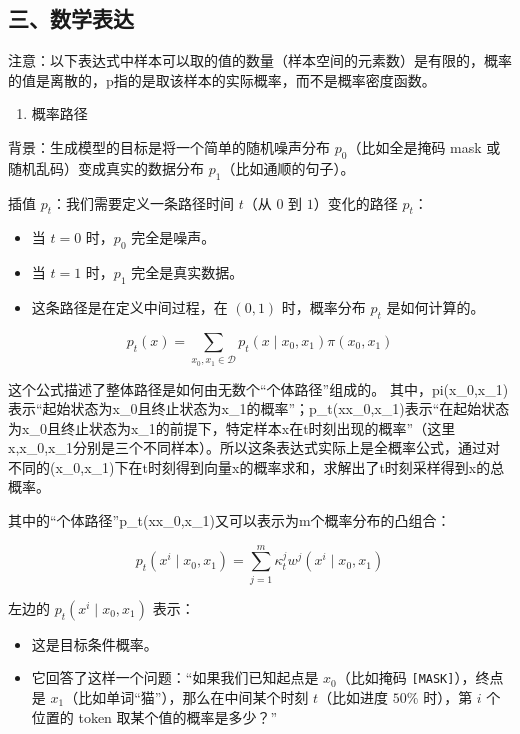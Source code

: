 \hypertarget{ux4e09ux6570ux5b66ux8868ux8fbe-3}{%
\subsection{三、数学表达}\label{ux4e09ux6570ux5b66ux8868ux8fbe-3}}

注意：以下表达式中样本可以取的值的数量（样本空间的元素数）是有限的，概率的值是离散的，p指的是取该样本的实际概率，而不是概率密度函数。

\begin{enumerate}
\def\labelenumi{\arabic{enumi}.}
\tightlist
\item
  概率路径
\end{enumerate}

背景：生成模型的目标是将一个简单的随机噪声分布 \(p_0\)（比如全是掩码 mask 或随机乱码）变成真实的数据分布 \(p_1\)（比如通顺的句子）。

插值 \(p_t\)：我们需要定义一条路径时间 \(t\)（从 \(0\) 到 \(1\)）变化的路径 \(p_t\)：

\begin{itemize}
\tightlist
\item
  当 \(t=0\) 时，\(p_0\) 完全是噪声。
\item
  当 \(t=1\) 时，\(p_1\) 完全是真实数据。
\item
  这条路径是在定义中间过程，在 \((0,1)\) 时，概率分布 \(p_t\) 是如何计算的。
\end{itemize}

\[
p_t(x)=\sum_{x_0,x_1\in\mathcal{D}}p_t(x\mid x_0,x_1)\pi(x_0,x_1)
\]

这个公式描述了整体路径是如何由无数个``个体路径''组成的。
其中，pi(x\_0,x\_1)表示``起始状态为x\_0且终止状态为x\_1的概率''；p\_t(x\textbar x\_0,x\_1)表示``在起始状态为x\_0且终止状态为x\_1的前提下，特定样本x在t时刻出现的概率''（这里x,x\_0,x\_1分别是三个不同样本）。所以这条表达式实际上是全概率公式，通过对不同的(x\_0,x\_1)下在t时刻得到向量x的概率求和，求解出了t时刻采样得到x的总概率。

其中的``个体路径''p\_t(x\textbar x\_0,x\_1)又可以表示为m个概率分布的凸组合：

\[
p_t(x^i\mid x_0,x_1)=\sum_{j=1}^m\kappa_t^j w^j(x^i\mid x_0,x_1)
\]

左边的 \(p_t(x^i\mid x_0,x_1)\) 表示：

\begin{itemize}
\tightlist
\item
  这是目标条件概率。
\item
  它回答了这样一个问题：``如果我们已知起点是 \(x_0\)（比如掩码 \texttt{{[}MASK{]}}），终点是 \(x_1\)（比如单词``猫''），那么在中间某个时刻 \(t\)（比如进度 \(50\%\) 时），第 \(i\) 个位置的 token 取某个值的概率是多少？''
\end{itemize}

